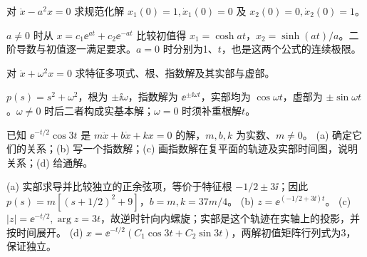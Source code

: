 \begin{exercise}\label{cw:rec07-6}
对 $\ddot x-a^2x=0$ 求规范化解 $x_1(0)=1,\dot x_1(0)=0$ 及 $x_2(0)=0,\dot x_2(0)=1$。
\end{exercise}
\begin{solution}
$a\ne0$ 时从 $x=c_1\ee^{at}+c_2\ee^{-at}$ 比较初值得 $x_1=\cosh at$，$x_2=\sinh(at)/a$。二阶导数与初值逐一满足要求。$a=0$ 时分别为1、$t$，也是这两个公式的连续极限。
\par{}
\end{solution}

\begin{exercise}\label{cw:rec08-1}
对 $\ddot x+\omega^2x=0$ 求特征多项式、根、指数解及其实部与虚部。
\end{exercise}
\begin{solution}
$p(s)=s^2+\omega^2$，根为 $\pm\ii\omega$，指数解为 $\ee^{\pm\ii\omega t}$，实部均为 $\cos\omega t$，虚部为 $\pm\sin\omega t$。$\omega\ne0$ 时后二者构成实基本解；$\omega=0$ 时须补重根解$t$。
\par{}
\end{solution}

\begin{exercise}\label{cw:rec08-2}
已知 $\ee^{-t/2}\cos3t$ 是 $m\ddot x+b\dot x+kx=0$ 的解，$m,b,k$ 为实数、$m\ne0$。
(a) 确定它们的关系；(b) 写一个指数解；(c) 画指数解在复平面的轨迹及实部时间图，说明关系；(d) 给通解。
\end{exercise}
\begin{solution}
(a) 实部求导并比较独立的正余弦项，等价于特征根 $-1/2\pm3\ii$；因此 $p(s)=m[(s+1/2)^2+9]$，$b=m,k=37m/4$。
(b) $z=\ee^{(-1/2+3\ii)t}$。
(c) $|z|=\ee^{-t/2},\arg z=3t$，故逆时针向内螺旋；实部是这个轨迹在实轴上的投影，并按时间展开。
(d) $x=\ee^{-t/2}(C_1\cos3t+C_2\sin3t)$，两解初值矩阵行列式为3，保证独立。\begin{center}\end{center}
\par{}
\end{solution}

